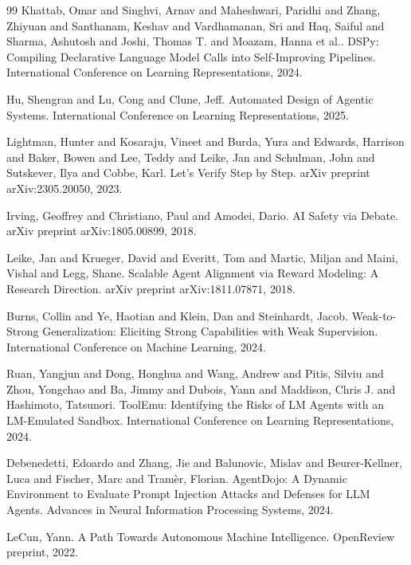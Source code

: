 \documentclass[11pt,a4paper]{article}
\begin{document}
\begin{thebibliography}{99}
Khattab, Omar and Singhvi, Arnav and Maheshwari, Paridhi and Zhang, Zhiyuan and Santhanam, Keshav and Vardhamanan, Sri and Haq, Saiful and Sharma, Ashutosh and Joshi, Thomas T. and Moazam, Hanna et al..
\newblock DSPy: Compiling Declarative Language Model Calls into Self-Improving Pipelines.
\newblock International Conference on Learning Representations, 2024.

Hu, Shengran and Lu, Cong and Clune, Jeff.
\newblock Automated Design of Agentic Systems.
\newblock International Conference on Learning Representations, 2025.

Lightman, Hunter and Kosaraju, Vineet and Burda, Yura and Edwards, Harrison and Baker, Bowen and Lee, Teddy and Leike, Jan and Schulman, John and Sutskever, Ilya and Cobbe, Karl.
\newblock Let's Verify Step by Step.
\newblock arXiv preprint arXiv:2305.20050, 2023.

Irving, Geoffrey and Christiano, Paul and Amodei, Dario.
\newblock AI Safety via Debate.
\newblock arXiv preprint arXiv:1805.00899, 2018.

Leike, Jan and Krueger, David and Everitt, Tom and Martic, Miljan and Maini, Vishal and Legg, Shane.
\newblock Scalable Agent Alignment via Reward Modeling: A Research Direction.
\newblock arXiv preprint arXiv:1811.07871, 2018.

Burns, Collin and Ye, Haotian and Klein, Dan and Steinhardt, Jacob.
\newblock Weak-to-Strong Generalization: Eliciting Strong Capabilities with Weak Supervision.
\newblock International Conference on Machine Learning, 2024.

Ruan, Yangjun and Dong, Honghua and Wang, Andrew and Pitis, Silviu and Zhou, Yongchao and Ba, Jimmy and Dubois, Yann and Maddison, Chris J. and Hashimoto, Tatsunori.
\newblock ToolEmu: Identifying the Risks of LM Agents with an LM-Emulated Sandbox.
\newblock International Conference on Learning Representations, 2024.

Debenedetti, Edoardo and Zhang, Jie and Balunovic, Mislav and Beurer-Kellner, Luca and Fischer, Marc and Tram{\`e}r, Florian.
\newblock AgentDojo: A Dynamic Environment to Evaluate Prompt Injection Attacks and Defenses for LLM Agents.
\newblock Advances in Neural Information Processing Systems, 2024.

LeCun, Yann.
\newblock A Path Towards Autonomous Machine Intelligence.
\newblock OpenReview preprint, 2022.


\end{thebibliography}
\end{document}
